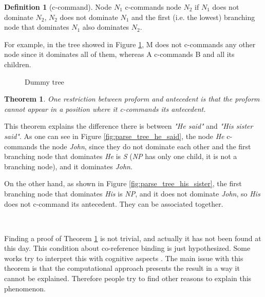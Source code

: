 \documentclass[a4paper]{article}
\newtheorem{theorem}{Theorem}[section]
\theoremstyle{definition}
\newtheorem{definition}{Definition}[section]
\begin{document}
\begin{definition}[c-command]
Node $N_1$ c-commands node $N_2$ if $N_1$ does not dominate $N_2$, $N_2$ does not dominate $N_1$ and the first (i.e. the lowest) branching node that dominates $N_1$ also dominates $N_2$.
\end{definition}

For example, in the tree showed in Figure \ref{fig:dummy_tree}, M does not c-commands any other node since it dominates all of them, whereas A c-commands B and all its children.

\begin{figure}
\centering
{}
\caption{Dummy tree\label{fig:dummy_tree}}
\end{figure}

\begin{theorem}
\label{thm:ccommand}
One restriction between proform and antecedent is that the proform cannot appear in a position where it c-commands its antecedent.
\end{theorem}

This theorem explains the difference there is between \emph{"He said"} and \emph{"His sister said"}. As one can see in Figure \ref{fig:parse_tree_he_said}, the node \emph{He} c-commands the node \emph{John}, since they do not dominate each other and the first branching node that dominates \emph{He} is \emph{S} (\emph{NP} has only one child, it is not a branching node), and it dominates \emph{John}.

On the other hand, as shown in Figure \ref{fig:parse_tree_his_sister}, the first branching node that dominates \emph{His} is \emph{NP}, and it does not dominate \emph{John}, so \emph{His} does not c-command its antecedent. They can be associated together.

~\par

Finding a proof of Theorem \ref{thm:ccommand} is not trivial, and actually it has not been found at this day. This condition about co-reference binding is just hypothesized. Some works try to interpret this with cognitive aspects \cite{bouchard2010explication}. The main issue with this theorem is that the computational approach presents the result in a way it cannot be explained. Therefore people try to find other reasons to explain this phenomenon.
\end{document}

